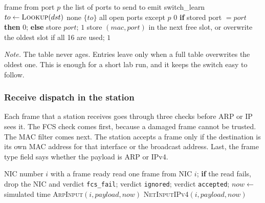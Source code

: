 \begin{algorithm}[H]\small
\caption{Choose the output ports ( in  lines 29--45;  in  lines 22--38)}
\label{alg:switch}
\begin{algorithmic}[1]
\Require frame from port $p$
\Ensure the list of ports to send to
   emit switch\_learn \EndIf
  \State $to \gets \textsc{Lookup}(dst)$ 
     \Return none
    \EndIf
    \State \Return $\{to\}$
  \EndIf
\EndIf
\State \Return all open ports except $p$ 
\Statex
{}
   \Return $0$ 
  \EndIf
    \State \textbf{if} stored port $= port$ \textbf{then} \Return $0$; \textbf{else} store $port$; \Return $1$ 
  \EndIf
  \State store $(mac, port)$ in the next free slot, or overwrite the oldest slot if all 16 are used; \Return $1$
\EndFunction
\end{algorithmic}
\end{algorithm}

\emph{Note.} The table never ages. Entries leave only when a full table overwrites the oldest one. This is enough for a short lab run, and it keeps the switch easy to follow.

\subsubsection{Receive dispatch in the station}
Each frame that a station receives goes through three checks before ARP or IP sees it. The FCS check comes first, because a damaged frame cannot be trusted. The MAC filter comes next. The station accepts a frame only if the destination is its own MAC address for that interface or the broadcast address. Last, the frame type field says whether the payload is ARP or IPv4.

\begin{algorithm}[H]\small
\caption{Station receive ( in  lines 50--64)}
\label{alg:rx}
\begin{algorithmic}[1]
\Require NIC number $i$ with a frame ready
\State read one frame from NIC $i$; \textbf{if} the read fails, drop the NIC and \Return
{} verdict \texttt{fcs\_fail}; \Return
\EndIf
{} verdict \texttt{ignored}; \Return
\EndIf
\State verdict \texttt{accepted}; $now \gets$ simulated time
 \textsc{ArpInput}$(i, payload, now)$ 
 \textsc{NetInputIPv4}$(i, payload, now)$ 
\EndIf
\end{algorithmic}
\end{algorithm}

